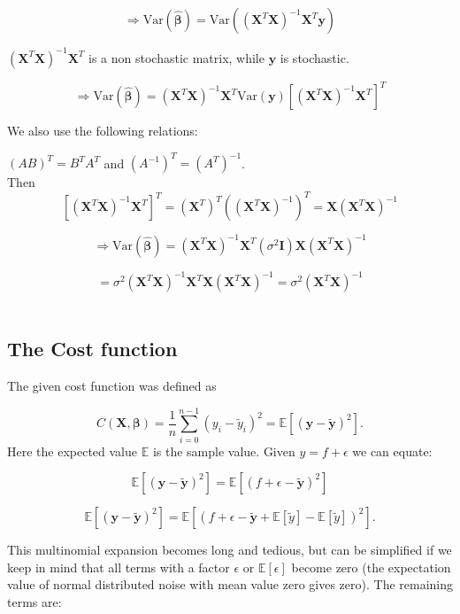 \documentclass[reprint,english,notitlepage]{revtex4-1}  %
\begin{document}
    $$\Rightarrow \mathrm{Var}(\boldsymbol{\hat{\beta}}) = \mathrm{Var}((\mathbf{X}^T\mathbf{X})^{-1}\mathbf{X}^T\mathbf{y})$$

    
    $(\mathbf{X}^T\mathbf{X})^{-1}\mathbf{X}^T$ is a non stochastic matrix, while $\mathbf{y}$ is stochastic. 

    $$\Rightarrow \mathrm{Var}(\boldsymbol{\hat{\beta}}) = (\mathbf{X}^T\mathbf{X})^{-1}\mathbf{X}^T \mathrm{Var}(\mathbf{y})[(\mathbf{X}^T\mathbf{X})^{-1}\mathbf{X}^T]^T$$

    We also use the following relations:

    $(AB)^T = B^TA^T$ and $(A^{-1})^T = (A^T)^{-1}$. \\

    Then 
    $$[(\mathbf{X}^T\mathbf{X})^{-1}\mathbf{X}^T]^T = (\mathbf{X}^T)^T((\mathbf{X}^T\mathbf{X})^{-1})^T = \mathbf{X}(\mathbf{X}^T\mathbf{X})^{-1}$$

    $$\Rightarrow \mathrm{Var}(\boldsymbol{\hat{\beta}}) = (\mathbf{X}^T\mathbf{X})^{-1}\mathbf{X}^T (\sigma^2 \boldsymbol{I}) \mathbf{X} (\mathbf{X}^T\mathbf{X})^{-1}$$


    $$= \sigma^2 (\mathbf{X}^T\mathbf{X})^{-1}\mathbf{X}^T  \mathbf{X} (\mathbf{X}^T\mathbf{X})^{-1} = \sigma^2(\mathbf{X}^T\mathbf{X})^{-1}$$\\

\subsection{The Cost function}

The given cost function was defined as

\[
C(\bm{X},\bm{\beta}) =\frac{1}{n}\sum_{i=0}^{n-1}(y_i-\tilde{y}_i)^2=\mathbb{E}\left[(\bm{y}-\bm{\tilde{y}})^2\right].
\]
Here the expected value $\mathbb{E}$ is the sample value. Given $y = f + \epsilon$ we can equate:

$$\mathbb{E}\left[(\bm{y}-\bm{\tilde{y}})^2\right] = \mathbb{E}\left[(f + \epsilon -\bm{\tilde{y}})^2\right]$$

$$\mathbb{E}\left[(\bm{y}-\bm{\tilde{y}})^2\right] = \mathbb{E}\left[(f + \epsilon -\bm{\tilde{y}} + \mathbb{E}[\tilde{y}] - \mathbb{E}[\tilde{y}])^2\right].$$

This multinomial expansion becomes long and tedious, but can be simplified if we keep in mind that all terms with a factor $\epsilon$ or $\mathbb{E}[\epsilon]$ become zero (the expectation value of normal distributed noise with mean value zero gives zero). The remaining terms are:
\end{document}
